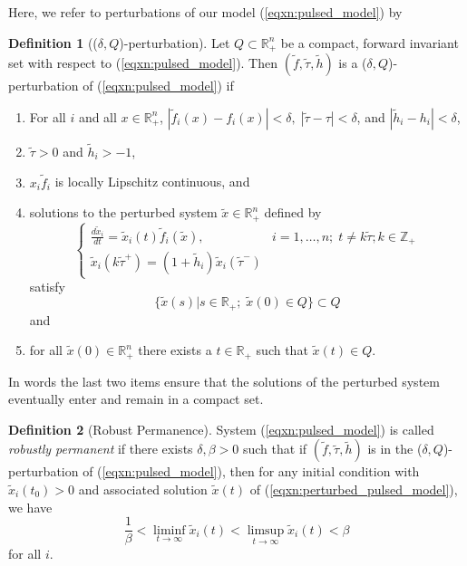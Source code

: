 \documentclass{article}
\theoremstyle{definition}
\newtheorem{definition}{Definition}[section]
\newcommand{\R}{{\mathbb{R}}}
\newcommand{\Z}{{\mathbb{Z}}}
\begin{document}
Here, we refer to perturbations of our model (\ref{eqxn:pulsed_model}) by 

\begin{definition}[($\delta, Q$)-perturbation] Let $Q \subset \R^n_+$ be a compact, forward invariant set with respect to (\ref{eqxn:pulsed_model}). Then $(\tilde{f}, \tilde{\tau}, \tilde{h})$ is a ($\delta,Q$)-perturbation of (\ref{eqxn:pulsed_model}) if
\begin{enumerate}
     \item  For all $i$ and all $x \in \R^n_+$, $|\tilde{f}_i(x)-f_i(x)| < \delta, \; |\tilde{\tau}-\tau| < \delta$, and $|\tilde{h}_i - h_i| < \delta$,
     \item $\tilde{\tau} > 0$ and $\tilde{h}_i > -1$,
     \item $x_i\tilde{f}_i$ is locally Lipschitz continuous, and 
    \item solutions to the perturbed  system $\tilde{x} \in \R^n_+$ defined by
    \begin{equation}\label{eqxn:perturbed_pulsed_model}
    \begin{cases}
        \frac{d\tilde{x}_i}{dt} = \tilde{x}_i(t)\tilde{f}_i(\tilde x), & i = 1, \ldots, n; \; t \neq k\tilde \tau; k \in \Z_+\\
        \tilde{x}_i(k\tilde \tau^+) = (1 + \tilde{h}_i)\tilde{x}_i(\tilde \tau^-)
    \end{cases}
    \end{equation}
    satisfy
       $$
    \{\tilde{x}(s) | s \in \R_+; \; \tilde x(0) \in Q\}  \subset Q
    $$
   and 
   \item for all $\tilde x(0)\in \R^n_+$ there exists a $t \in \R_+$ such that $\tilde{x}(t) \in Q$.
\end{enumerate}

\end{definition}

In words the last two items ensure that the solutions of the perturbed system eventually enter and remain in a compact set. 

\begin{definition}[Robust Permanence]\label{def:robust_permanence} System (\ref{eqxn:pulsed_model}) is called \emph{robustly permanent} if there exists $\delta, \beta > 0$ such that if $(\tilde{f}, \tilde{\tau}, \tilde{h})$ is in the ($\delta, Q$)-perturbation of (\ref{eqxn:pulsed_model}), then for any initial condition with $\tilde{x}_i(t_0) > 0$ and associated solution $\tilde{x}(t)$ of (\ref{eqxn:perturbed_pulsed_model}), we have
    \begin{equation*}
        \frac{1}{\beta} < \liminf_{t \to \infty} \tilde{x}_i(t) < \limsup_{t \to \infty} \tilde{x}_i(t) < \beta
    \end{equation*} for all $i$.
\end{definition}
\end{document}
